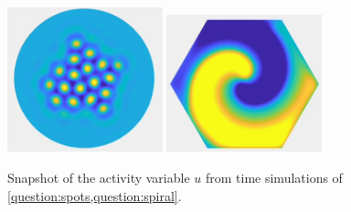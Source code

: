 \documentclass[a4paper]{siamonline220329}
\theoremstyle{plain}
\begin{document}
\begin{figure}
  \centering
  \includegraphics[width = 0.4\textwidth]{spots}
  \includegraphics[width = 0.4\textwidth]{spiral}
  \caption{Snapshot of the activity variable $u$ from time simulations of
  \cref{question:spots,question:spiral}.}
  \label{fig:patterns}
\end{figure}
  
\end{document}
